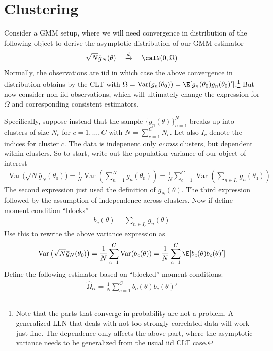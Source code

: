 \documentclass[12pt]{article}
\theoremstyle{plain}
\theoremstyle{definition}
\theoremstyle{remark}
\newcommand{\Var}{\operatorname{Var}}
\newcommand{\dto}{\xrightarrow{d}}
\newcommand{\sumnN}{\sum^N_{n=1}}
\newcommand{\nN}{_{n=1}^N}
\begin{document}
\clearpage
\section{Clustering}

Consider a GMM setup, where we will need convergence in distribution of
the following object to derive the asymptotic distribution of our GMM
estimator
\begin{align*}
  \sqrt{N}\bar{g}_N(\theta)
  \quad\dto\quad
  \calN(0,\Omega)
\end{align*}
Normally, the observations are iid in which case the above convergence
in distribution obtains by the CLT with
$\Omega=\Var(g_n(\theta_0))=\E[g_n(\theta_0)g_n(\theta_0)']$.\footnote{%
  Note that the parts that converge in probability are not a problem. A
  generalized LLN that deals with not-too-strongly correlated data will
  work just fine. The dependence only affects the above part, where the
  asymptotic variance needs to be generalized from the usual
  iid CLT case.
}
But now consider non-iid observations, which will ultimately change the
expression for $\Omega$ and corresponding consistent estimators.

Specifically, suppose instead that the sample $\{g_n(\theta)\}\nN$
breaks up into clusters of size $N_c$ for $c=1,\ldots,C$ with
$N=\sum_{c=1}^CN_c$.
Let also $I_c$ denote the indices for cluster $c$.
The data is indepenent only \emph{across} clusters, but dependent within
clusters.
So to start, write out the population variance of our object of interest
\begin{align*}
  \Var\big(\sqrt{N}\bar{g}_N(\theta_0)\big)
  =
  \frac{1}{N}
  \Var\left(
    \sumnN
    g_n(\theta_0)
  \right)
  =
  \frac{1}{N}
  \sum_{c=1}^C
  \Var\left(
    \sum_{n\in I_c}
    g_n(\theta_0)
  \right)
\end{align*}
The second expression just used the definition of $\bar{g}_N(\theta)$.
The third expression followed by the assumption of independence across
clusters. Now if define moment condition ``blocks''
\begin{align*}
  b_c(\theta)
  =
  \sum_{n\in I_c}
  g_n(\theta)
\end{align*}
Use this to rewrite the above variance expression as
\begin{align*}
  \Var\big(\sqrt{N}\bar{g}_N(\theta_0)\big)
  =
  \frac{1}{N}
  \sum_{c=1}^C
  \Var(b_c(\theta))
  =
  \frac{1}{N}
  \sum_{c=1}^C
  \E[b_c(\theta)b_c(\theta)']
\end{align*}
Define the following estimator based on ``blocked'' moment conditions:
\begin{align*}
  \hat{\Omega}_{cl}
  =
  \frac{1}{N}
  \sum_{c=1}^C
  b_c(\theta)b_c(\theta)'
\end{align*}
\end{document}
